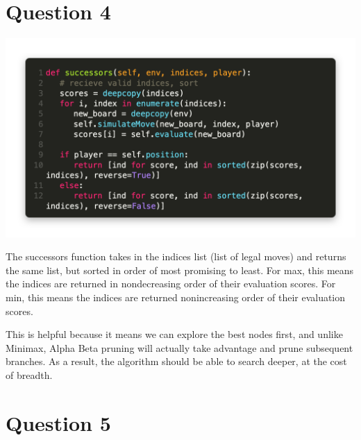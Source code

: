 \documentclass{article}
\begin{document}
\section{Question 4}

\includegraphics[width = \linewidth]{codye_succ.png}

The successors function takes in the indices list (list of legal moves) and returns the same list, but sorted in order of most promising to least.
For max, this means the indices are returned in nondecreasing order of their evaluation scores. 
For min, this means the indices are returned nonincreasing order of their evaluation scores.

This is helpful because it means we can explore the best nodes first, and unlike Minimax, Alpha Beta pruning will actually take advantage and prune subsequent branches.
As a result, the algorithm should be able to search deeper, at the cost of breadth.

\section{Question 5}
\end{document}
